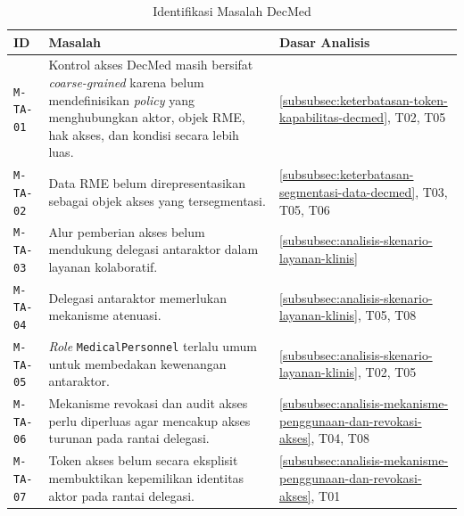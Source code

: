 \begin{table}[H]
	\centering
	\caption{Identifikasi Masalah DecMed}
	\label{tab:identifikasi-masalah-decmed}
	\small
	\begin{tabular}{|p{}|p{}|p{}|}
		\hline
		\textbf{ID}      & \textbf{Masalah}                                                                                                                                                                       & \textbf{Dasar Analisis}                                                    \\ \hline
		\texttt{M-TA-01} & Kontrol akses DecMed masih bersifat \textit{coarse-grained} karena belum mendefinisikan \textit{policy} yang menghubungkan aktor, objek RME, hak akses, dan kondisi secara lebih luas. & \ref{subsubsec:keterbatasan-token-kapabilitas-decmed}, T02, T05            \\ \hline
		\texttt{M-TA-02} & Data RME belum direpresentasikan sebagai objek akses yang tersegmentasi.                                                                                                               & \ref{subsubsec:keterbatasan-segmentasi-data-decmed}, T03, T05, T06         \\ \hline
		\texttt{M-TA-03} & Alur pemberian akses belum mendukung delegasi antaraktor dalam layanan kolaboratif.                                                                                                    & \ref{subsubsec:analisis-skenario-layanan-klinis}                           \\ \hline
		\texttt{M-TA-04} & Delegasi antaraktor memerlukan mekanisme atenuasi.                                                                                                                                     & \ref{subsubsec:analisis-skenario-layanan-klinis},     T05, T08             \\ \hline
		\texttt{M-TA-05} & \textit{Role} \texttt{MedicalPersonnel} terlalu umum untuk membedakan kewenangan antaraktor.                                                                                           & \ref{subsubsec:analisis-skenario-layanan-klinis}, T02, T05                 \\ \hline
		\texttt{M-TA-06} & Mekanisme revokasi dan audit akses perlu diperluas agar mencakup akses turunan pada rantai delegasi.                                                                                   & \ref{subsubsec:analisis-mekanisme-penggunaan-dan-revokasi-akses}, T04, T08 \\ \hline
		\texttt{M-TA-07} & Token akses belum secara eksplisit membuktikan kepemilikan identitas aktor pada rantai delegasi.                                                                                       & \ref{subsubsec:analisis-mekanisme-penggunaan-dan-revokasi-akses}, T01      \\ \hline
	\end{tabular}
\end{table}

